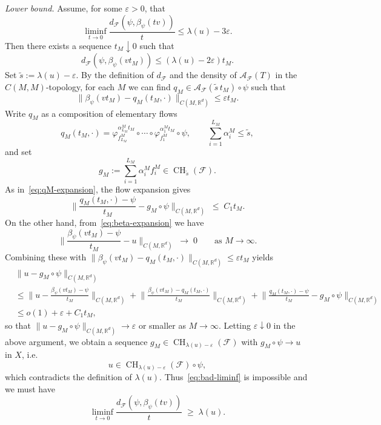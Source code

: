 \documentclass[12pt]{amsart}
\numberwithin{equation}{section}
\theoremstyle{remark}
\begin{document}
\emph{Lower bound.}
Assume, for some $\varepsilon>0$, that
\begin{equation}\label{eq:bad-liminf}
  \liminf_{t\to 0}\frac{d_{\mathcal F}(\psi,\beta_\psi(tv))}{t}
  \le \lambda(u) - 3\varepsilon.
\end{equation}
Then there exists a sequence $t_M\downarrow 0$ such that
\[
d_{\mathcal F}(\psi,\beta_\psi(vt_M))
\le (\lambda(u)-2\varepsilon)t_M.
\]
Set $\tilde s := \lambda(u)-\varepsilon$. By the definition of $d_{\mathcal F}$ and the
density of $\mathcal A_{\mathcal F}(T)$ in the $C(M,M)$-topology, for each $M$ we can find
$q_M\in \mathcal A_{\mathcal F}(\tilde s\,t_M)\circ\psi$ such that
\[
\|\beta_\psi(vt_M) - q_M(t_M,\cdot)\|_{C(M,\mathbb R^d)} \le \varepsilon t_M.
\]
Write $q_M$ as a composition of elementary flows
\[
q_M(t_M,\cdot)
= \varphi^{\alpha_{L_M}^M t_M}_{f_{L_M}^M}
  \circ\cdots\circ
  \varphi^{\alpha_1^M t_M}_{f_1^M}\circ\psi,
\qquad
\sum_{i=1}^{L_M}\alpha_i^M \le \tilde s,
\]
and set
\[
g_M := \sum_{i=1}^{L_M}\alpha_i^M f_i^M\in \operatorname{CH}_{\tilde s}(\mathcal F).
\]
As in~\eqref{eq:qM-expansion}, the flow expansion gives
\[
\Big\|\frac{q_M(t_M,\cdot)-\psi}{t_M} - g_M\circ\psi\Big\|_{C(M,\mathbb R^d)}
\;\leq\; C_1 t_M.
\]
On the other hand, from~\eqref{eq:beta-expansion} we have
\[
\Big\|\frac{\beta_\psi(vt_M)-\psi}{t_M} - u\Big\|_{C(M,\mathbb R^d)} \;\to\; 0
\qquad\text{as }M\to\infty.
\]
Combining these with
$\|\beta_\psi(vt_M) - q_M(t_M,\cdot)\|_{C(M,\mathbb R^d)} \le \varepsilon t_M$ yields
\begin{align*}
&\|u - g_M\circ\psi\|_{C(M,\mathbb R^d)} \\
&\le
  \Big\|u - \frac{\beta_\psi(vt_M)-\psi}{t_M}\Big\|_{C(M,\mathbb R^d)}
+ \Big\|\frac{\beta_\psi(vt_M)-q_M(t_M,\cdot)}{t_M}\Big\|_{C(M,\mathbb R^d)}
+ \Big\|\frac{q_M(t_M,\cdot)-\psi}{t_M} - g_M\circ\psi\Big\|_{C(M,\mathbb R^d)} \\
&\le o(1) + \varepsilon + C_1 t_M,
\end{align*}
so that $\|u - g_M\circ\psi\|_{C(M,\mathbb R^d)}\to \varepsilon$ or smaller as $M\to\infty$.
Letting $\varepsilon\downarrow 0$ in the above argument, we obtain a sequence
$g_M\in \operatorname{CH}_{\lambda(u)-\varepsilon}(\mathcal F)$ with
$g_M\circ\psi\to u$ in $X$, i.e.
\[
u\in \operatorname{CH}_{\lambda(u)-\varepsilon}(\mathcal F)\circ\psi,
\]
which contradicts the definition of $\lambda(u)$. Thus~\eqref{eq:bad-liminf} is
impossible and we must have
\[
\liminf_{t\to 0}\frac{d_{\mathcal F}(\psi,\beta_\psi(tv))}{t}
\;\ge\; \lambda(u).
\]
\end{document}
